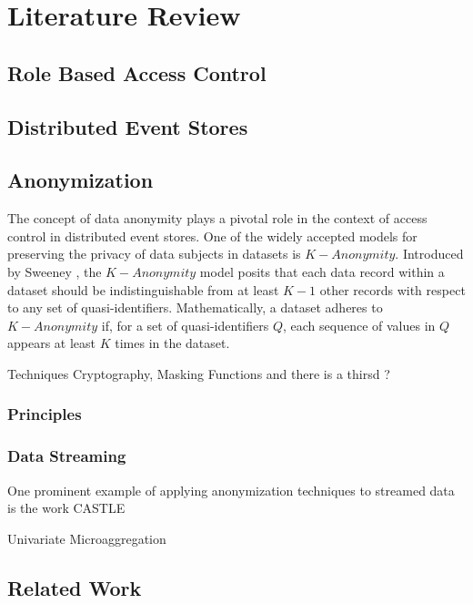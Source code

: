 \chapter{Literature Review\label{cha:chapter2}}

\section{Role Based Access Control}

\section{Distributed Event Stores}

\section{Anonymization\label{sec:anon}}


The concept of data anonymity plays a pivotal role in the context of access control in distributed event stores. One of the widely accepted models for preserving the privacy of data subjects in datasets is $K-Anonymity$. Introduced by Sweeney \cite{sweeney2002kanonymity}, the $K-Anonymity$ model posits that each data record within a dataset should be indistinguishable from at least $K-1$ other records with respect to any set of quasi-identifiers. Mathematically, a dataset adheres to $K-Anonymity$ if, for a set of quasi-identifiers $Q$, each sequence of values in $Q$ appears at least $K$ times in the dataset.


Techniques 
Cryptography, Masking Functions and there is a thirsd ?

\subsection{Principles}

\subsection{Data Streaming\label{lit:data_streaming}}
One prominent example of applying anonymization techniques to streamed data is the work CASTLE \cite{Cao2008}

Univariate Microaggregation \label{lit:univariate}

\section{Related Work}

